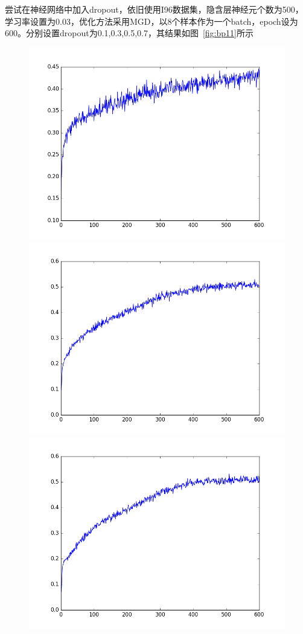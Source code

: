 尝试在神经网络中加入dropout，依旧使用I96数据集，隐含层神经元个数为500，学习率设置为0.03，优化方法采用MGD，以8个样本作为一个batch，epoch设为600。分别设置dropout为0.1,0.3,0.5,0.7，其结果如图~\ref{fig:bp11}所示
\begin{figure}[htb]
\centering
\includegraphics[scale=0.35]{../figures/Log/BP_new1_6/BP_new1_6_acc.png} 
\includegraphics[scale=0.35]{../figures/Log/BP_new1_3/BP_new1_3_acc.png}
\includegraphics[scale=0.35]{../figures/Log/BP_new1_4/BP_new1_4_acc.png} 

\end{figure}
